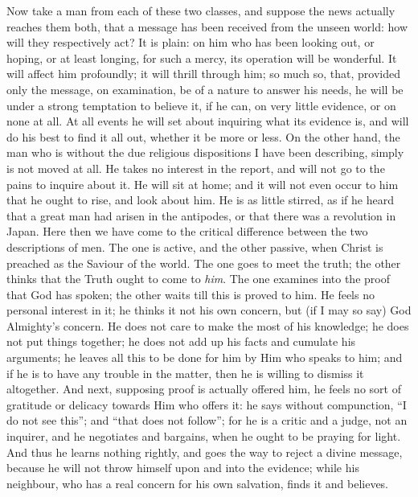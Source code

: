 Now take a man from each of these two classes, and
suppose the news actually reaches them both, that a
message has been received from the unseen world: how will
they respectively act? It is plain: on him who has been
looking out, or hoping, or at least longing, for such a
mercy, its operation will be wonderful. It will affect
him profoundly; it will thrill through him; so much so,
that, provided only the message, on examination, be of a
nature to answer his needs, he will be under a strong
temptation to believe it, if he can, on very little
evidence, or on none at all. At all events he will set
about inquiring what its evidence is, and will do his
best to find it all out, whether it be more or less. On
the other hand, the man who is without the due religious
dispositions I have been describing, simply is not moved
at all. He takes no interest in the report, and will not
go to the pains to inquire about it. He will sit at home;
and it will not even occur to him that he ought to rise,
and look about him. He is as little stirred, as if he
heard that a great man had arisen in the antipodes, or
that there was a revolution in Japan. Here then we have
come to the critical difference between the two
descriptions of men. The one is active, and the other
passive, when Christ is preached as the Saviour of the
world. The one goes to meet the truth; the other thinks
that the Truth ought to come to \emph{him}. The one examines into the proof that God has spoken; the other
waits till this is proved to him. He feels no personal
interest in it; he thinks it not his own concern, but (if
I may so say) God Almighty's concern. He does not care to
make the most of his knowledge; he does not put things
together; he does not add up his facts and cumulate his
arguments; he leaves all this to be done for him by Him
who speaks to him; and if he is to have any trouble in
the matter, then he is willing to dismiss it altogether.
And next, supposing proof is actually offered him, he
feels no sort of gratitude or delicacy towards Him who
offers it: he says without compunction, ``I do not
see this''; and ``that does not follow''; for
he is a critic and a judge, not an inquirer, and he
negotiates and bargains, when he ought to be praying for
light. And thus he learns nothing rightly, and goes the
way to reject a divine message, because he will not throw
himself upon and into the evidence; while his neighbour,
who has a real concern for his own salvation, finds it
and believes.

